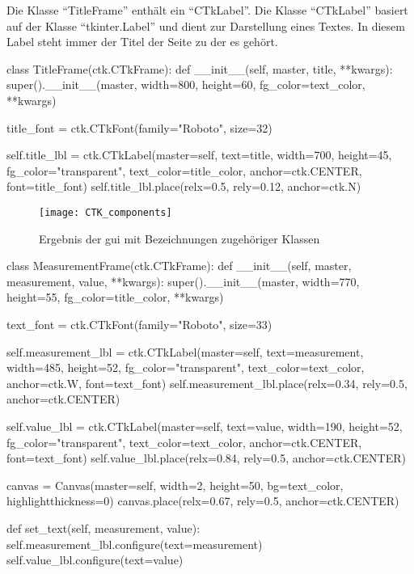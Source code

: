 Die Klasse \enquote{TitleFrame} enthält ein \enquote{CTkLabel}. Die Klasse \enquote{CTkLabel} basiert auf der Klasse \enquote{tkinter.Label} und dient zur Darstellung eines Textes. In diesem Label steht immer der Titel der Seite zu der es gehört.

\begin{pythoncode}
class TitleFrame(ctk.CTkFrame):
	def __init__(self, master, title, **kwargs):
		super().__init__(master, width=800, height=60, fg_color=text_color, **kwargs)
		
		title_font = ctk.CTkFont(family="Roboto", size=32)
		
		self.title_lbl = ctk.CTkLabel(master=self, text=title, width=700, height=45, fg_color="transparent", text_color=title_color, anchor=ctk.CENTER, font=title_font)
		self.title_lbl.place(relx=0.5, rely=0.12, anchor=ctk.N)
\end{pythoncode}




\begin{figure}[H]
	\centering
	\texttt{[image: CTK\_components]}
	\caption{Ergebnis der \acs{gui} mit Bezeichnungen zugehöriger Klassen \label{fig:ctk_components}}
\end{figure}

\begin{pythoncode}
class MeasurementFrame(ctk.CTkFrame):
	def __init__(self, master, measurement, value, **kwargs):
		super().__init__(master, width=770, height=55, fg_color=title_color, **kwargs)
		
		text_font = ctk.CTkFont(family="Roboto", size=33)
		
		self.measurement_lbl = ctk.CTkLabel(master=self, text=measurement, width=485, height=52, fg_color="transparent", text_color=text_color, anchor=ctk.W, font=text_font)
		self.measurement_lbl.place(relx=0.34, rely=0.5, anchor=ctk.CENTER)
		
		self.value_lbl = ctk.CTkLabel(master=self, text=value, width=190, height=52, fg_color="transparent", text_color=text_color, anchor=ctk.CENTER, font=text_font)
		self.value_lbl.place(relx=0.84, rely=0.5, anchor=ctk.CENTER)
		
		canvas = Canvas(master=self, width=2, height=50, bg=text_color, highlightthickness=0)
		canvas.place(relx=0.67, rely=0.5, anchor=ctk.CENTER)
	
	def set_text(self, measurement, value):
		self.measurement_lbl.configure(text=measurement)
		self.value_lbl.configure(text=value)
\end{pythoncode}
	
